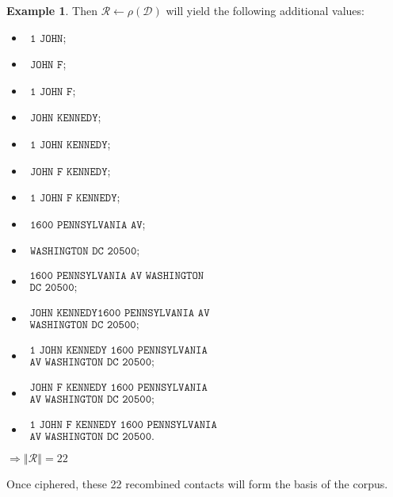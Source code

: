 \documentclass[twoside,twocolumn]{article}
\newcommand{\norm}[1]{\left\Vert#1\right\Vert}
\theoremstyle{definition}
\newtheorem{example}{Example}
\theoremstyle{remark}
\begin{document}
\begin{example}
    Then $\mathcal{R} \gets \rho(\mathcal{D})$ will yield the following additional values:
    \begin{small} \begin{itemize}
        \item $~~\texttt{1 JOHN}$;
        \item $~~\texttt{JOHN F}$;
        \item $~~\texttt{1 JOHN F}$;
        \item $~~\texttt{JOHN KENNEDY}$;
        \item $~~\texttt{1 JOHN KENNEDY}$;
        \item $~~\texttt{JOHN F KENNEDY}$;
        \item $~~\texttt{1 JOHN F KENNEDY}$;
        \item $~~\texttt{1600 PENNSYLVANIA AV}$;
        \item $~~\texttt{WASHINGTON DC 20500}$;
        \item $\begin{array}{l} \texttt{1600 PENNSYLVANIA AV WASHINGTON} \\ \texttt{DC 20500}; \end{array}$
        \item $\begin{array}{l} \texttt{JOHN KENNEDY} \texttt{1600 PENNSYLVANIA AV} \\\texttt{WASHINGTON DC 20500}; \end{array}$
        \item $\begin{array}{l} \texttt{1 JOHN KENNEDY 1600 PENNSYLVANIA} \\ \texttt{AV WASHINGTON DC 20500}; \end{array}$
        \item $\begin{array}{l} \texttt{JOHN F KENNEDY 1600 PENNSYLVANIA} \\ \texttt{AV WASHINGTON DC 20500}; \end{array}$
        \item $\begin{array}{l} \texttt{1 JOHN F KENNEDY 1600 PENNSYLVANIA} \\ \texttt{AV WASHINGTON DC 20500}. \end{array}$
    \end{itemize} \end{small}
    $\Longrightarrow \norm{\mathcal{R}} = 22$

    Once ciphered, these 22 recombined contacts will form the basis of the corpus.
\end{example}
\end{document}
